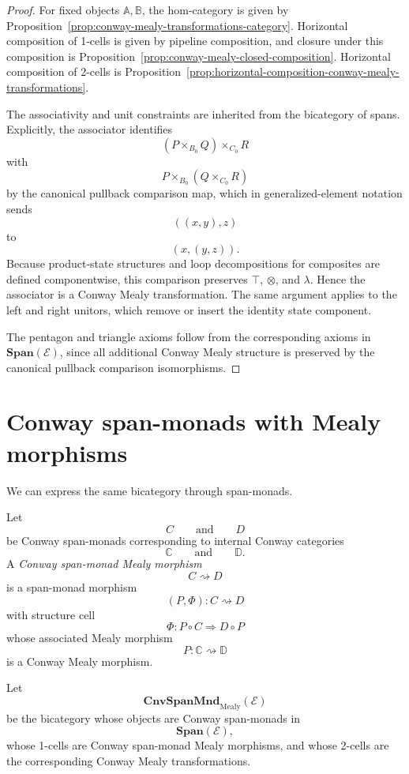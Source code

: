 \begin{proof}
For fixed objects \(\mathbb A,\mathbb B\), the hom-category is given by
Proposition~\ref{prop:conway-mealy-transformations-category}.  Horizontal
composition of 1-cells is given by pipeline composition, and closure under
this composition is Proposition~\ref{prop:conway-mealy-closed-composition}.
Horizontal composition of 2-cells is
Proposition~\ref{prop:horizontal-composition-conway-mealy-transformations}.

The associativity and unit constraints are inherited from the bicategory of
spans.  Explicitly, the associator identifies
\[
(P\times_{B_0}Q)\times_{C_0}R
\]
with
\[
P\times_{B_0}(Q\times_{C_0}R)
\]
by the canonical pullback comparison map, which in generalized-element
notation sends
\[
((x,y),z)
\]
to
\[
(x,(y,z)).
\]
Because product-state structures and loop decompositions for composites are
defined componentwise, this comparison preserves \(\top\), \(\otimes\), and
\(\lambda\).  Hence the associator is a Conway Mealy transformation.  The same
argument applies to the left and right unitors, which remove or insert the
identity state component.

The pentagon and triangle axioms follow from the corresponding axioms in
\(\mathbf{Span}(\mathcal E)\), since all additional Conway Mealy structure is
preserved by the canonical pullback comparison isomorphisms.
\end{proof}

\section{Conway span-monads with Mealy morphisms}
\label{sec:conway-span-monads-with-mealy-morphisms}

We can express the same bicategory through span-monads.

\begin{definition}
\label{def:conway-span-monad-mealy-morphism}
Let
\[
C
\qquad\text{and}\qquad
D
\]
be Conway span-monads corresponding to internal Conway categories
\[
\mathbb C
\qquad\text{and}\qquad
\mathbb D.
\]
A \emph{Conway span-monad Mealy morphism}
\[
C\rightsquigarrow D
\]
is a span-monad morphism
\[
(P,\Phi):C\rightsquigarrow D
\]
with structure cell
\[
\Phi:P\circ C\Rightarrow D\circ P
\]
whose associated Mealy morphism
\[
P:\mathbb C\rightsquigarrow\mathbb D
\]
is a Conway Mealy morphism.
\end{definition}

\begin{definition}
\label{def:cnvspanmnd-mealy}
Let
\[
\mathbf{CnvSpanMnd}_{\mathrm{Mealy}}(\mathcal E)
\]
be the bicategory whose objects are Conway span-monads in
\[
\mathbf{Span}(\mathcal E),
\]
whose 1-cells are Conway span-monad Mealy morphisms, and whose 2-cells are
the corresponding Conway Mealy transformations.
\end{definition}

